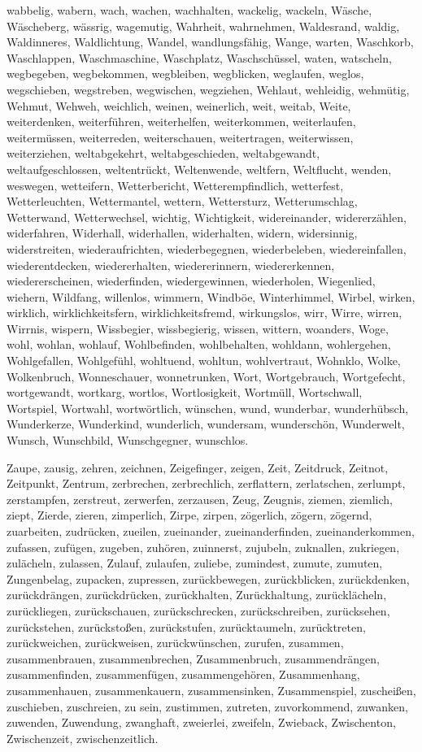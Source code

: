 \documentclass[a4paper,10pt,fleqn,twocolumn,twoside,dvipdfmx]{scrartcl}
\begin{document}
wabbelig,
wabern,
wach,
wachen,
wachhalten,
wackelig,
wackeln,
Wäsche,
Wäscheberg,
wässrig,
wagemutig,
Wahrheit,
wahrnehmen,
Waldesrand,
waldig,
Waldinneres,
Waldlichtung,
Wandel,
wandlungsfähig,
Wange,
warten,
Waschkorb,
Waschlappen,
Waschmaschine,
Waschplatz,
Waschschüssel,
waten,
watscheln,
wegbegeben,
wegbekommen,
wegbleiben,
wegblicken,
weglaufen,
weglos,
wegschieben,
wegstreben,
wegwischen,
wegziehen,
Wehlaut,
wehleidig,
wehmütig,
Wehmut,
Wehweh,
weichlich,
weinen,
weinerlich,
weit,
weitab,
Weite,
weiterdenken,
weiterführen,
weiterhelfen,
weiterkommen,
weiterlaufen,
weitermüssen,
weiterreden,
weiterschauen,
weitertragen,
weiterwissen,
weiterziehen,
weltabgekehrt,
weltabgeschieden,
weltabgewandt,
weltaufgeschlossen,
weltentrückt,
Weltenwende,
weltfern,
Weltflucht,
wenden,
weswegen,
wetteifern,
Wetterbericht,
Wetterempfindlich,
wetterfest,
Wetterleuchten,
Wettermantel,
wettern,
Wettersturz,
Wetterumschlag,
Wetterwand,
Wetterwechsel,
wichtig,
Wichtigkeit,
widereinander,
widererzählen,
widerfahren,
Widerhall,
widerhallen,
widerhalten,
widern,
widersinnig,
widerstreiten,
wiederaufrichten,
wiederbegegnen,
wiederbeleben,
wiedereinfallen,
wiederentdecken,
wiedererhalten,
wiedererinnern,
wiedererkennen,
wiedererscheinen,
wiederfinden,
wiedergewinnen,
wiederholen,
Wiegenlied,
wiehern,
Wildfang,
willenlos,
wimmern,
Windböe,
Winterhimmel,
Wirbel,
wirken,
wirklich,
wirklichkeitsfern,
wirklichkeitsfremd,
wirkungslos,
wirr,
Wirre,
wirren,
Wirrnis,
wispern,
Wissbegier,
wissbegierig,
wissen,
wittern,
woanders,
Woge,
wohl,
wohlan,
wohlauf,
Wohlbefinden,
wohlbehalten,
wohldann,
wohlergehen,
Wohlgefallen,
Wohlgefühl,
wohltuend,
wohltun,
wohlvertraut,
Wohnklo,
Wolke,
Wolkenbruch,
Wonneschauer,
wonnetrunken,
Wort,
Wortgebrauch,
Wortgefecht,
wortgewandt,
wortkarg,
wortlos,
Wortlosigkeit,
Wortmüll,
Wortschwall,
Wortspiel,
Wortwahl,
wortwörtlich,
wünschen,
wund,
wunderbar,
wunderhübsch,
Wunderkerze,
Wunderkind,
wunderlich,
wundersam,
wunderschön,
Wunderwelt,
Wunsch,
Wunschbild,
Wunschgegner,
wunschlos.

\newpage\noindent
Zaupe,
zausig,
zehren,
zeichnen,
Zeigefinger,
zeigen,
Zeit,
Zeitdruck,
Zeitnot,
Zeitpunkt,
Zentrum,
zerbrechen,
zerbrechlich,
zerflattern,
zerlatschen,
zerlumpt,
zerstampfen,
zerstreut,
zerwerfen,
zerzausen,
Zeug,
Zeugnis,
ziemen,
ziemlich,
ziept,
Zierde,
zieren,
zimperlich,
Zirpe,
zirpen,
zögerlich,
zögern,
zögernd,
zuarbeiten,
zudrücken,
zueilen,
zueinander,
zueinanderfinden,
zueinanderkommen,
zufassen,
zufügen,
zugeben,
zuhören,
zuinnerst,
zujubeln,
zuknallen,
zukriegen,
zulächeln,
zulassen,
Zulauf,
zulaufen,
zuliebe,
zumindest,
zumute,
zumuten,
Zungenbelag,
zupacken,
zupressen,
zurückbewegen,
zurückblicken,
zurückdenken,
zurückdrängen,
zurückdrücken,
zurückhalten,
Zurückhaltung,
zurücklächeln,
zurückliegen,
zurückschauen,
zurückschrecken,
zurückschreiben,
zurücksehen,
zurückstehen,
zurückstoßen,
zurückstufen,
zurücktaumeln,
zurücktreten,
zurückweichen,
zurückweisen,
zurückwünschen,
zurufen,
zusammen,
zusammenbrauen,
zusammenbrechen,
Zusammenbruch,
zusammendrängen,
zusammenfinden,
zusammenfügen,
zusammengehören,
Zusammenhang,
zusammenhauen,
zusammenkauern,
zusammensinken,
Zusammenspiel,
zuscheißen,
zuschieben,
zuschreien,
zu sein,
zustimmen,
zutreten,
zuvorkommend,
zuwanken,
zuwenden,
Zuwendung,
zwanghaft,
zweierlei,
zweifeln,
Zwieback,
Zwischenton,
Zwischenzeit,
zwischenzeitlich.
\end{document}
